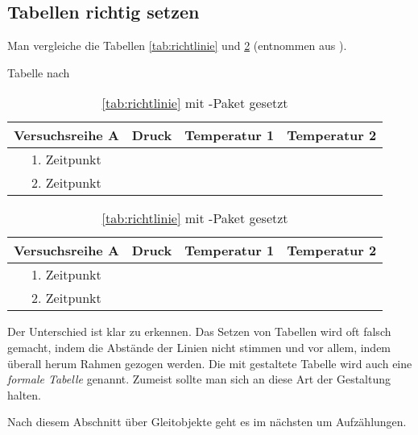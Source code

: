 \subsection{Tabellen richtig setzen}
\label{subsec:Tabellensatz}
%
Man vergleiche die Tabellen \ref{tab:richtlinie} und \ref{tab:richtlinie2} (entnommen
aus \cite{Markus2016}).
%
\begin{table}[htpb]
\centering
\caption{Tabelle nach \cite{Goossens1995}}
\label{tab:richtlinie}
\begin{tabular}{|c|c|c|c|}
\hline
     Versuchsreihe A&Druck & Temperatur 1 & Temperatur 2\\
\hline
     1. Zeitpunkt& &&\\
\hline
     2. Zeitpunkt& &&\\
\hline
\end{tabular}
%
\bigskip
%
\caption{\autoref{tab:richtlinie} mit -Paket \cite{Els2016} gesetzt}
\begin{tabular}{cccc}
\midrule
     Versuchsreihe A&Druck & Temperatur 1 & Temperatur 2\\
\toprule
     1. Zeitpunkt& &&\\
     2. Zeitpunkt& &&\\
\bottomrule
\end{tabular}
\label{tab:richtlinie2}
\end{table}
%

Der Unterschied ist klar zu erkennen.  Das Setzen von Tabellen wird oft falsch gemacht, indem die
Abstände der Linien nicht stimmen und vor allem, indem überall herum Rahmen gezogen werden. 
Die mit  gestaltete Tabelle wird auch eine \emph{formale Tabelle} genannt.
Zumeist sollte man sich an diese Art der Gestaltung halten.

Nach diesem Abschnitt über Gleitobjekte geht es im nächsten um Aufzählungen.
%
%